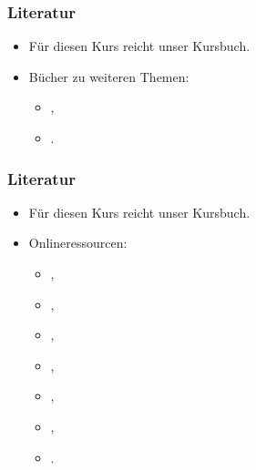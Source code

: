 \documentclass[aspectratio=169,mathserif,notheorems]{beamer}%
\begin{document}
%
\begin{frame}[t]\frametitle{Literatur}%
\begin{itemize}%
\item Für diesen Kurs reicht unser Kursbuch\cite{programmingWithPython}.%
\item Bücher zu weiteren Themen:\begin{itemize}%
\item {},%
\item {}.%
\end{itemize}%
\end{itemize}%
\end{frame}%
%
\begin{frame}[t]\frametitle{Literatur}%
\begin{itemize}%
\item Für diesen Kurs reicht unser Kursbuch\cite{programmingWithPython}.%
\item Onlineressourcen:\begin{itemize}%
\item {},
\item {},%
\item {},%
\item {},%
\item {},%
\item {},%
\item {}.%
\end{itemize}%
\end{itemize}%
\end{frame}%
%
\end{document}
